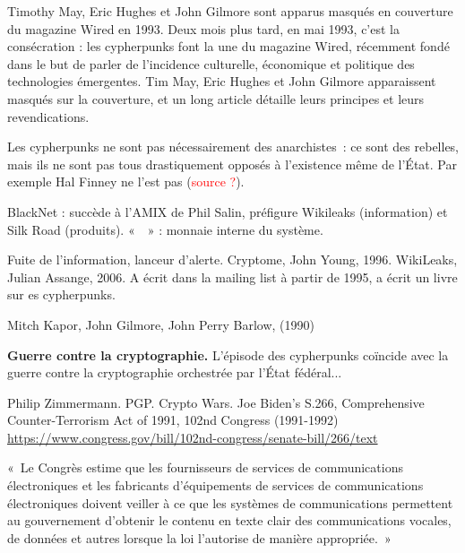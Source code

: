 Timothy May, Eric Hughes et John Gilmore sont apparus masqués en couverture du magazine Wired en 1993. Deux mois plus tard, en mai 1993, c'est la consécration : les cypherpunks font la une du magazine Wired, récemment fondé dans le but de parler de l'incidence culturelle, économique et politique des technologies émergentes. Tim May, Eric Hughes et John Gilmore apparaissent masqués sur la couverture, et un long article détaille leurs principes et leurs revendications.



Les cypherpunks ne sont pas nécessairement des anarchistes~: ce sont des rebelles, mais ils ne sont pas tous drastiquement opposés à l'existence même de l'État. Par exemple Hal Finney ne l'est pas (\textcolor{red}{source ?}).

BlackNet : succède à l'AMIX de Phil Salin, préfigure Wikileaks (information) et Silk Road (produits). «~~» : monnaie interne du système.

Fuite de l'information, lanceur d'alerte. Cryptome, John Young, 1996. WikiLeaks, Julian Assange, 2006. A écrit dans la mailing list à partir de 1995, a écrit un livre sur es cypherpunks.

Mitch Kapor, John Gilmore, John Perry Barlow,  (1990)



\textbf{Guerre contre la cryptographie.} L'épisode des cypherpunks coïncide avec la guerre contre la cryptographie orchestrée par l'État fédéral...

Philip Zimmermann. PGP. Crypto Wars. Joe Biden's S.266, Comprehensive Counter-Terrorism Act of 1991, 102nd Congress (1991-1992) \url{https://www.congress.gov/bill/102nd-congress/senate-bill/266/text}

«~Le Congrès estime que les fournisseurs de services de communications électroniques et les fabricants d'équipements de services de communications électroniques doivent veiller à ce que les systèmes de communications permettent au gouvernement d'obtenir le contenu en texte clair des communications vocales, de données et autres lorsque la loi l'autorise de manière appropriée.~»


